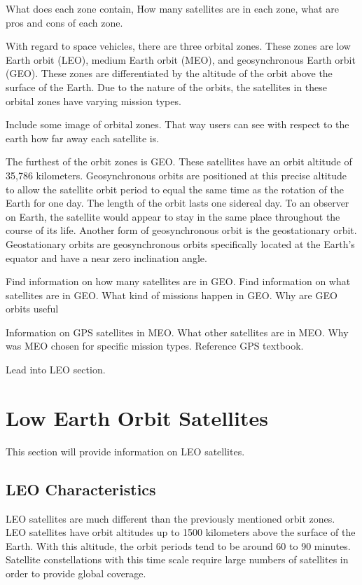 \documentclass[12pt]{report}
\begin{document}
What does each zone contain, How many satellites are in each zone, what are pros and cons of each zone.

With regard to space vehicles, there are three orbital zones. These zones are low Earth orbit (LEO), medium Earth orbit (MEO), and geosynchronous Earth orbit (GEO). These zones are differentiated by the altitude of the orbit above the surface of the Earth. Due to the nature of the orbits, the satellites in these orbital zones have varying mission types. 

Include some image of orbital zones. That way users can see with respect to the earth how far away each satellite is. 


The furthest of the orbit zones is GEO. These satellites have an orbit altitude of 35,786 kilometers. Geosynchronous orbits are positioned at this precise altitude to allow the satellite orbit period to equal the same time as the rotation of the Earth for one day. The length of the orbit lasts one sidereal day. To an observer on Earth, the satellite would appear to stay in the same place throughout the course of its life. Another form of geosynchronous orbit is the geostationary orbit. Geostationary orbits are geosynchronous orbits specifically located at the Earth's equator and have a near zero inclination angle. 

Find information on how many satellites are in GEO. Find information on what satellites are in GEO. What kind of missions happen in GEO. Why are GEO orbits useful 


Information on GPS satellites in MEO. What other satellites are in MEO. Why was MEO chosen for specific mission types. Reference GPS textbook. 

Lead into LEO section. 

\section{Low Earth Orbit Satellites}
This section will provide information on LEO satellites.

\subsection{LEO Characteristics}

LEO satellites are much different than the previously mentioned orbit zones. LEO satellites have orbit altitudes up to 1500 kilometers above the surface of the Earth. With this altitude, the orbit periods tend to be around 60 to 90 minutes. Satellite constellations with this time scale require large numbers of satellites in order to provide global coverage.
\end{document}
